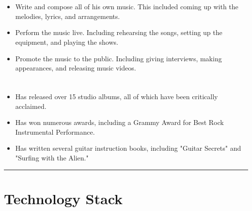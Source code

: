 \documentclass[12pt]{../templates/classes/res}
\begin{document}
\begin{resume}
\begin{multicols}{2}
  \section{}
    \begin{itemize}
      \item Write and compose all of his own music. This included coming up with the melodies, lyrics, and arrangements.
\item Perform the music live. Including rehearsing the songs, setting up the equipment, and playing the shows.
\item Promote the music to the public. Including giving interviews, making appearances, and releasing music videos.
    \end{itemize}
  \section{}
    \begin{itemize}
      \setlength{\itemindent}{0pt}
      \item Has released over 15 studio albums, all of which have been critically acclaimed.
\item Has won numerous awards, including a Grammy Award for Best Rock Instrumental Performance.
\item Has written several guitar instruction books, including "Guitar Secrets" and "Surfing with the Alien."
    \end{itemize}
\end{multicols}

\vspace{-20pt}
\begin{minipage}[t]{0.55\linewidth}
  \rule{0.25\textwidth}{2pt}
  \begin{multicols}{2}
    \section{Technology Stack}
    \columnbreak
    \section{}
  \end{multicols}
  \vspace{1pt}
\end{minipage}
\hfill
\begin{minipage}[t]{0.42\linewidth}
  \vspace{18pt}

\end{minipage}
\end{resume}
\end{document}

